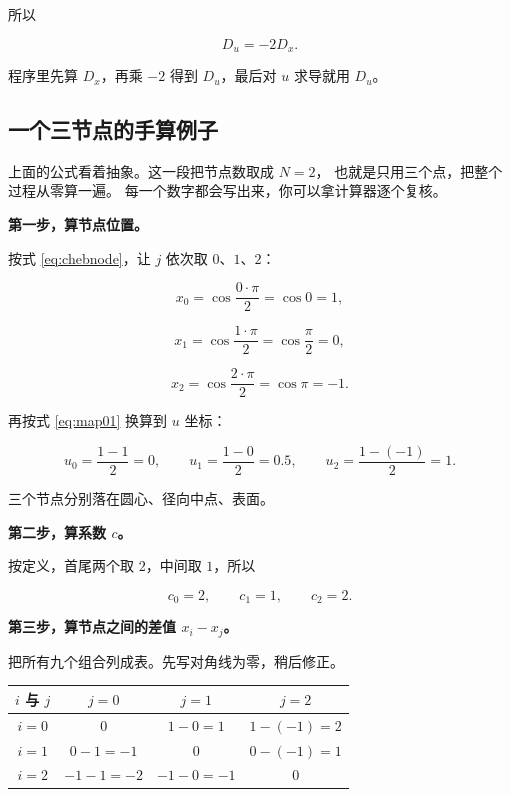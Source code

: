 所以

\begin{equation}
D_u = -2D_x .
\label{eq:du}
\end{equation}

程序里先算 $D_x$，再乘 $-2$ 得到 $D_u$，最后对 $u$ 求导就用 $D_u$。

\subsection{一个三节点的手算例子}

上面的公式看着抽象。这一段把节点数取成 $N=2$，
也就是只用三个点，把整个过程从零算一遍。
每一个数字都会写出来，你可以拿计算器逐个复核。

\textbf{第一步，算节点位置。}

按式 \eqref{eq:chebnode}，让 $j$ 依次取 $0$、$1$、$2$：

\begin{equation}
x_0=\cos\frac{0\cdot\pi}{2}=\cos0=1,
\end{equation}

\begin{equation}
x_1=\cos\frac{1\cdot\pi}{2}=\cos\frac{\pi}{2}=0,
\end{equation}

\begin{equation}
x_2=\cos\frac{2\cdot\pi}{2}=\cos\pi=-1 .
\end{equation}

再按式 \eqref{eq:map01} 换算到 $u$ 坐标：

\begin{equation}
u_0=\frac{1-1}{2}=0,\qquad
u_1=\frac{1-0}{2}=0.5,\qquad
u_2=\frac{1-(-1)}{2}=1 .
\end{equation}

三个节点分别落在圆心、径向中点、表面。

\textbf{第二步，算系数 $c$。}

按定义，首尾两个取 $2$，中间取 $1$，所以

\begin{equation}
c_0=2,\qquad c_1=1,\qquad c_2=2 .
\end{equation}

\textbf{第三步，算节点之间的差值 $x_i-x_j$。}

把所有九个组合列成表。先写对角线为零，稍后修正。

\begin{center}
\begin{tabular}{@{}c|ccc@{}}
\toprule
$i$ 与 $j$ & $j=0$ & $j=1$ & $j=2$ \\
\midrule
$i=0$ & $0$ & $1-0=1$ & $1-(-1)=2$ \\
$i=1$ & $0-1=-1$ & $0$ & $0-(-1)=1$ \\
$i=2$ & $-1-1=-2$ & $-1-0=-1$ & $0$ \\
\bottomrule
\end{tabular}
\end{center}

